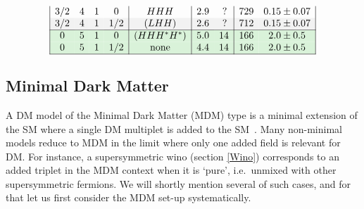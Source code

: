 \begin{table}[t]
\begin{center}
$$\begin{array}{|cccc|c|cc|cc|}
3/2 &4 & 1& 0 & HHH & 2.9& \,? & 729 & 0.15\pm 0.07\\  \rowcolor[rgb]{0.95,0.95,0.95}
3/2  &4 & 1& 1/2 & (LHH) & 2.6& \, ?  & 712  &0.15\pm 0.07\\  \rowcolor[rgb]{0.85,0.95,0.85}
\hline
0 & 5 &1 & 0 & (HHH^*H^*) &5.0 &  14  & 166  & 2.0\pm0.5\\   \rowcolor[rgb]{0.85,0.95,0.85}
0 & 5 & 1 & 1/2 & \hbox{none} &4.4 &  14  & 166 & 2.0\pm0.5 \\  
\hline
\end{array}
$$
\color{black}
\normalsize
\caption[Minimal Dark Matter properties]{\em {\bfseries Minimal Dark Matter}. The first columns define the quantum numbers of the possible DM weak multiplets.
The following ones show: the possible decay channels into SM particles that need to be forbidden (those in parenthesis correspond to dimension-5 operators);
the DM mass predicted from thermal abundance (either at tree level, left column, or including non-perturbative
Sommerfeld and bound-state corrections, right column, the latter not computed in all cases);
the predicted splitting between the charged and the neutral components of the DM weak multiplet;
the prediction for the SI DD cross section $\sigma_{\rm SI}$. 
\label{tab:MDM}}
\end{center}
\end{table}



\subsection{Minimal Dark Matter}
\label{MDM}
A DM model of the Minimal Dark Matter (MDM) type is a minimal extension of the SM 
where a single DM multiplet is added
to the SM~\cite{MDM}. 
Many non-minimal models reduce to MDM in the limit  where only one added field is relevant for DM. 
For instance, a supersymmetric wino (section \ref{Wino}) corresponds to an added triplet in the MDM context when it is `pure', i.e.~unmixed with other supersymmetric fermions. 
We will shortly mention several of such cases, and for that let us first consider the MDM set-up systematically.

\medskip

